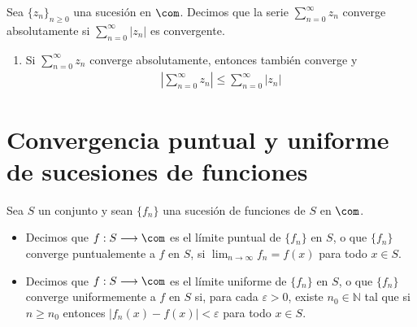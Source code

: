 \begin{defi}
Sea $\{z_n\}_{n \ge 0}$ una sucesión en $\com$. Decimos que la serie $\sum_{n=0}^{\infty}{z_n}$ converge absolutamente si $\sum_{n=0}^{\infty}{|z_n|}$ es convergente.
\end{defi}

\begin{obs}
\begin{enumerate}
    \item Si $\sum_{n=0}^{\infty}{z_n}$ converge absolutamente, entonces también converge y
    \begin{align*}
        \left| \sum_{n=0}^{\infty}{z_n} \right| \leq \sum_{n=0}^{\infty}{|z_n|}
    \end{align*}
\end{enumerate}
\end{obs}

\section{Convergencia puntual y uniforme de sucesiones de funciones}

\begin{defi}
Sea $S$ un conjunto y sean $\{f_n\}$ una sucesión de funciones de $S$ en $\com$.
\begin{itemize}
    \item Decimos que $f: S \longrightarrow \com$ es el límite puntual de $\{f_n\}$ en $S$, o que $\{f_n\}$ converge puntualemente a $f$ en $S$, si $\lim_{n \to \infty}{f_n} = f(x)$ para todo $x \in S$.
    \item Decimos que $f: S \longrightarrow \com$ es el límite uniforme de $\{f_n\}$ en $S$, o que $\{f_n\}$ converge uniformemente a $f$ en $S$ si, para cada $\varepsilon > 0$, existe $n_0 \in \mathbb{N}$ tal que si $n \ge n_0$ entonces $|f_n(x) - f(x)| < \varepsilon$ para todo $x \in S$.
\end{itemize}
\end{defi}

